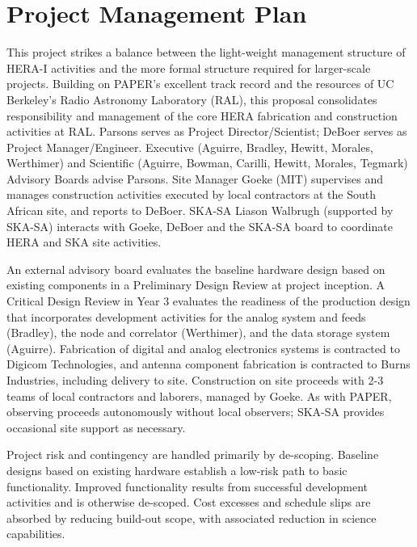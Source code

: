 \documentclass[preprint]{aastex}
\begin{document}
\section{Project Management Plan}

This project strikes a balance between the light-weight
management structure of HERA-I activities and the more formal structure
required for larger-scale projects.  Building on PAPER's excellent track record
and the resources of UC Berkeley's Radio Astronomy Laboratory (RAL),
this proposal consolidates responsibility and management of the core HERA
fabrication and construction activities at RAL. Parsons serves as
Project Director/Scientist; DeBoer serves as Project Manager/Engineer.
Executive 
(Aguirre, Bradley, Hewitt, Morales, Werthimer) 
and Scientific (Aguirre, Bowman, Carilli, Hewitt, Morales, Tegmark) Advisory Boards advise Parsons.
Site Manager Goeke (MIT) supervises and manages
construction activities executed by local contractors at the South African
site, and reports to DeBoer.  SKA-SA Liason Walbrugh (supported by SKA-SA)
interacts with Goeke, DeBoer and the SKA-SA board to
coordinate HERA and SKA site activities.

An external advisory board evaluates the baseline hardware design 
based on existing components in a Preliminary Design Review at project inception.
A Critical Design Review in Year 3 evaluates the readiness of the
production design that incorporates development activities for the analog system
and feeds (Bradley), the node and correlator (Werthimer), and the data storage
system (Aguirre).  Fabrication of digital and analog electronics systems 
is contracted to Digicom Technologies, and antenna
component fabrication is contracted to Burns Industries, 
including delivery to site.  Construction on site proceeds
with 2-3 teams of local contractors and laborers, managed by Goeke.  As with
PAPER, observing proceeds autonomously without local observers; SKA-SA
provides occasional site support as necessary.

Project risk and contingency are handled primarily by de-scoping.  Baseline designs based
on existing hardware establish a low-risk path to basic functionality.  Improved functionality
results from successful development activities and is otherwise de-scoped.
Cost excesses and schedule slips are absorbed by reducing
build-out scope, with associated reduction in science capabilities.
\end{document}
